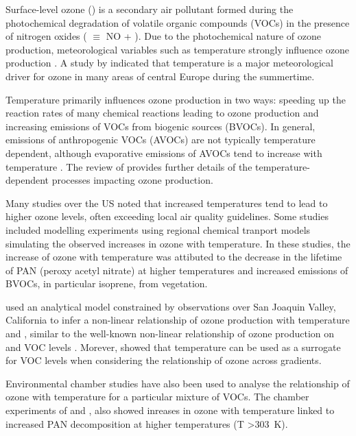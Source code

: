 Surface-level ozone () is a secondary air pollutant formed during the photochemical degradation of volatile organic compounds (VOCs) in the presence of nitrogen oxides ( $\equiv$ NO + ).
Due to the photochemical nature of ozone production, meteorological variables such as temperature strongly influence ozone production \citep{Jacob:2009}.
A study by \citet{Otero:2016} indicated that temperature is a major meteorological driver for ozone in many areas of central Europe during the summertime.

Temperature primarily influences ozone production in two ways: speeding up the reaction rates of many chemical reactions leading to ozone production and increasing emissions of VOCs from biogenic sources (BVOCs).
In general, emissions of anthropogenic VOCs (AVOCs) are not typically temperature dependent, although evaporative emissions of AVOCs tend to increase with temperature \citep{Rubin:2006}.
The review of \citet{Pusede:2015} provides further details of the temperature-dependent processes impacting ozone production.

Many studies over the US \citep{Sillman:1995a, Dawson:2007, Pusede:2014} noted that increased temperatures tend to lead to higher ozone levels, often exceeding local air quality guidelines.
Some studies \citep{Sillman:1995a, Dawson:2007} included modelling experiments using regional chemical tranport models simulating the observed increases in ozone with temperature.
In these studies, the increase of ozone with temperature was attibuted to the decrease in the lifetime of PAN (peroxy acetyl nitrate) at higher temperatures and increased emissions of BVOCs, in particular isoprene, from vegetation.

\citet{Pusede:2014} used an analytical model constrained by observations over San Joaquin Valley, California to infer a non-linear relationship of ozone production with temperature and , similar to the well-known non-linear relationship of ozone production on  and VOC levels \citep{Sillman:1999}.
Morever, \citet{Pusede:2014} showed that temperature can be used as a surrogate for VOC levels when considering the relationship of ozone across  gradients.

Environmental chamber studies have also been used to analyse the relationship of ozone with temperature for a particular mixture of VOCs.
The chamber experiments of \citet{Carter:1979} and \citet{Hatakeyama:1991}, also showed inreases in ozone with temperature linked to increased PAN decomposition at higher temperatures (T \textgreater 303~K).

